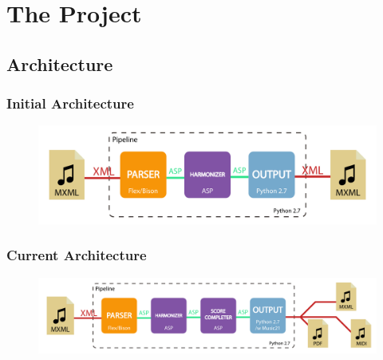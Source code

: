 \documentclass[english]{beamer}
\begin{document}
\section{The Project}
\subsection{Architecture}
	\begin{frame}
		\frametitle{Initial Architecture}
		\begin{figure}
		\centering
		\includegraphics[width=0.8\linewidth]{imagenes/arquitectura_inicial.pdf}
		\end{figure}
	\end{frame}
	\begin{frame}
		\frametitle{Current Architecture}
		\begin{figure}
		\centering
		\includegraphics[width=0.8\linewidth]{imagenes/arquitectura_final.pdf}
		\end{figure}
	\end{frame}
\end{document}
